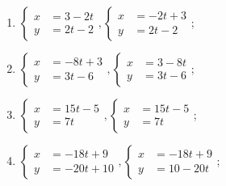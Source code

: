 	\vspace{10pt}
	\begin{enumerate}
		\setcounter{enumi}{\value{tasks}}
			\item \( \displaystyle \left\lbrace \begin{aligned}
						x &= 3-2t \\
						y &= 2t-2
					\end{aligned} \right., \left\lbrace \begin{aligned}
						x &= -2t+3 \\
						y &= 2t-2
					\end{aligned} \right. \);
			\item \( \displaystyle \left\lbrace \begin{aligned}
						x &= -8t+3 \\
						y &= 3t-6
					\end{aligned} \right., \left\lbrace \begin{aligned}
						x &= 3-8t \\
						y &= 3t-6
					\end{aligned} \right. \);
			\item \( \displaystyle \left\lbrace \begin{aligned}
						x &= 15t-5 \\
						y &= 7t
					\end{aligned} \right., \left\lbrace \begin{aligned}
						x &= 15t-5 \\
						y &= 7t
					\end{aligned} \right. \);
			\item \( \displaystyle \left\lbrace \begin{aligned}
						x &= -18t+9 \\
						y &= -20t+10
					\end{aligned} \right., \left\lbrace \begin{aligned}
						x &= -18t+9 \\
						y &= 10-20t
					\end{aligned} \right. \);

		\setcounter{tasks}{\value{enumi}}
	\end{enumerate}

